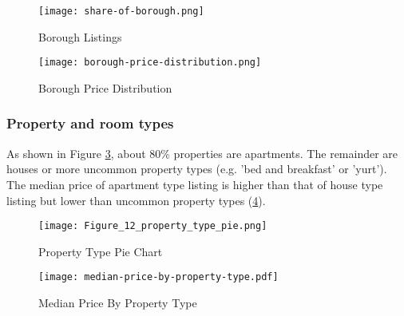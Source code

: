 \begin{figure}[!htbp] \centering
  \texttt{[image: share-of-borough.png]}
    \caption{Borough Listings}
    \label{fig:borough-number-of-listing}
\end{figure}





\begin{figure}[!htbp]\centering
    \texttt{[image: borough-price-distribution.png]}
    \caption{Borough Price Distribution}
    \label{fig:borough-price-distribution}
\end{figure}

\subsubsection*{Property and room types}

As shown in Figure \ref{fig:property_type},
about 80\% properties are apartments. The remainder are houses or more uncommon
property types (e.g. 'bed and breakfast' or 'yurt'). The median price of
apartment type listing is higher than that of house type listing but lower than
uncommon property types (\ref{fig:property_type_price}).

\begin{figure}[!htbp]
    \centering
        \centering
        \caption{Property Type Pie Chart}
        \texttt{[image: Figure\_12\_property\_type\_pie.png]}
      \label{fig:property_type}
\end{figure}

\begin{figure}[!htbp]
        \centering
        \texttt{[image: median-price-by-property-type.pdf]}
        \caption{Median Price By Property Type}
        \label{fig:property_type_price}
\end{figure}

